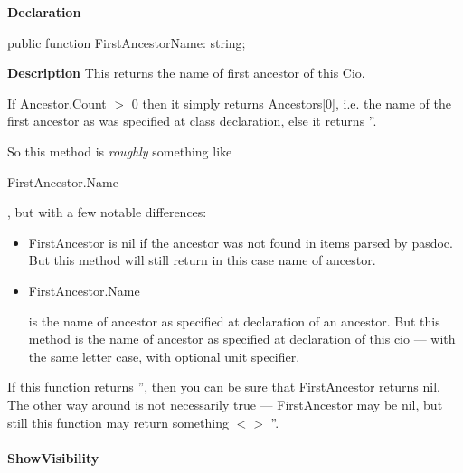 \documentclass{report}
\newif\ifpdf
\begin{document}
\label{PasDoc_Items.TPasCio-FirstAncestorName}
\begin{list}{}{
\setlength{\itemindent}{0cm}
\setlength{\listparindent}{0cm}
\setlength{\leftmargin}{\evensidemargin}
\addtolength{\leftmargin}{\tmplength}
\settowidth{\labelsep}{X}
\addtolength{\leftmargin}{\labelsep}
\setlength{\labelwidth}{\tmplength}
}
\item[\textbf{Declaration}\hfill]
\ifpdf
\begin{flushleft}
\fi
\begin{ttfamily}
public function FirstAncestorName: string;\end{ttfamily}

\ifpdf
\end{flushleft}
\fi

\par
\item[\textbf{Description}]
This returns the name of first ancestor of this Cio.

If Ancestor.Count {$>$} 0 then it simply returns Ancestors[0], i.e. the name of the first ancestor as was specified at class declaration, else it returns ''.

So this method is \textit{roughly} something like \begin{ttfamily}FirstAncestor.Name\end{ttfamily}, but with a few notable differences:

\begin{itemize}
\item  FirstAncestor is nil if the ancestor was not found in items parsed by pasdoc. But this method will still return in this case name of ancestor.
\item \begin{ttfamily}FirstAncestor.Name\end{ttfamily} is the name of ancestor as specified at declaration of an ancestor. But this method is the name of ancestor as specified at declaration of this cio --- with the same letter case, with optional unit specifier.
\end{itemize}

If this function returns '', then you can be sure that FirstAncestor returns nil. The other way around is not necessarily true --- FirstAncestor may be nil, but still this function may return something {$<$}{$>$} ''.

\end{list}
\paragraph*{ShowVisibility}\hspace*{\fill}
\end{document}

